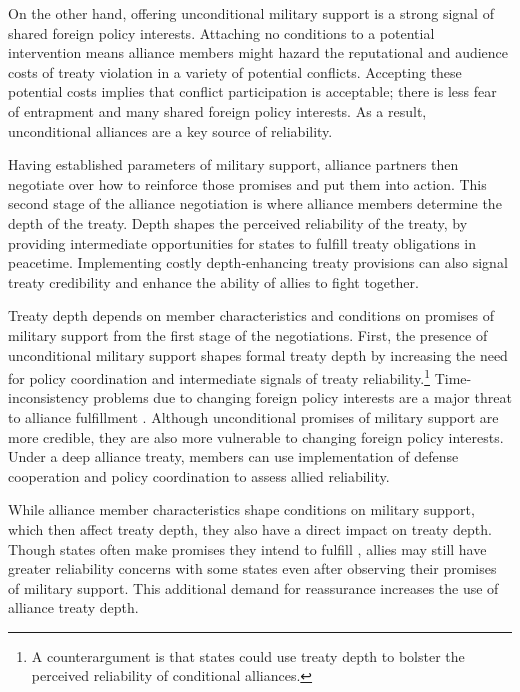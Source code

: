 \documentclass[12pt]{article}
\begin{document}
On the other hand, offering unconditional military support is a strong signal of shared foreign policy interests. 
Attaching no conditions to a potential intervention means alliance members might hazard the reputational \citep{Gibler2008, Crescenzietal2012} and audience \citep{Fearon1997} costs of treaty violation in a variety of potential conflicts. 
Accepting these potential costs implies that conflict participation is acceptable; there is less fear of entrapment and many shared foreign policy interests. 
As a result, unconditional alliances are a key source of reliability. 


Having established parameters of military support, alliance partners then negotiate over how to reinforce those promises and put them into action. 
This second stage of the alliance negotiation is where alliance members determine the depth of the treaty. 
Depth shapes the perceived reliability of the treaty, by providing intermediate opportunities for states to fulfill treaty obligations in peacetime. 
Implementing costly depth-enhancing treaty provisions can also signal treaty credibility and enhance the ability of allies to fight together. 


Treaty depth depends on member characteristics and conditions on promises of military support from the first stage of the negotiations.
First, the presence of unconditional military support shapes formal treaty depth by increasing the need for policy coordination and intermediate signals of treaty reliability.\footnote{A counterargument is that states could use treaty depth to bolster the perceived reliability of conditional alliances.}
Time-inconsistency problems due to changing foreign policy interests are a major threat to alliance fulfillment 
\citep{LeedsSavun2007}. 
Although unconditional promises of military support are more credible, they are also more vulnerable to changing foreign policy interests. 
Under a deep alliance treaty, members can use implementation of defense cooperation and policy coordination to assess allied reliability. 


While alliance member characteristics shape conditions on military support, which then affect treaty depth, they also have a direct impact on treaty depth.  
Though states often make promises they intend to fulfill \citep{DownsRockeBarsoom1996, Chibaetal2015}, allies may still have greater reliability concerns with some states even after observing their promises of military support. 
This additional demand for reassurance increases the use of alliance treaty depth. 
\end{document}
